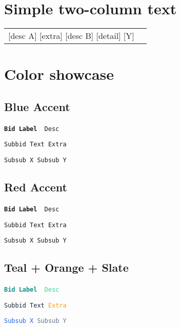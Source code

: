 \documentclass{article}
\makeatletter
\newlength{\bidLeftWidth}\setlength{\bidLeftWidth}{.40\linewidth}
\newlength{\bidRightWidth}\setlength{\bidRightWidth}{.60\linewidth}
\gdef\bidLabel{#1}\gdef\bidNeed{1}%
\gdef\bidNeed{0}%
\newenvironment{bidsemi}{%
  \par\ttfamily\small\parskip=0pt\parindent=0pt%
  \gdef\bidNeed{0}\gdef\bidLabel{}\gdef\bidDesc{}%
  \begin{tabular}{@{}p{\bidLeftWidth}@{\hspace{0.8em}}p{\bidRightWidth}@{}}%
}{\end{tabular}\par}
\makeatother
\begin{document}
\section*{Simple two-column text}
\begin{bidsemi}
\bid{A}[desc A]
\subbid{A1}
\subbid{A2}[extra]
\subbid{A3}
\bid{B}[desc B]
\subbid{B1}
\subbid{B2}
\bid{C}
\subbid{C1}
\subbid{C2}[detail]
\subsubbid{X}[Y]
\bid{D}
\bid{E}
\subbid{E1}
\end{bidsemi}

\section*{Color showcase}
\subsection*{Blue Accent}
\noindent
\texttt{\bfseries {\color{blue!70!black}Bid Label}}\ {\texttt{\color{blue!45}\small\ Desc}}\par
\texttt{\small {\color{black!90}Subbid Text}\ {\color{blue!45!black!50}Extra}}\par
\texttt{\small {\color{blue!60!black}Subsub X}\ {\color{blue!30!black}Subsub Y}}\par

\subsection*{Red Accent}
\noindent
\texttt{\bfseries {\color{red!70!black}Bid Label}}\ {\texttt{\color{red!45}\small\ Desc}}\par
\texttt{\small {\color{black!90}Subbid Text}\ {\color{red!45!black!50}Extra}}\par
\texttt{\small {\color{red!60!black}Subsub X}\ {\color{red!30!black}Subsub Y}}\par

\subsection*{Teal + Orange + Slate}
\noindent
\texttt{\bfseries {\textcolor[HTML]{0D9488}{Bid Label}}}\ {\texttt{\textcolor[HTML]{34D399}{\small\ Desc}}}\par
\texttt{\small {\textcolor[HTML]{1F2937}{Subbid Text}}\ {\textcolor[HTML]{F59E0B}{Extra}}}\par
\texttt{\small {\textcolor[HTML]{2563EB}{Subsub X}}\ {\textcolor[HTML]{64748B}{Subsub Y}}}\par
\end{document}
